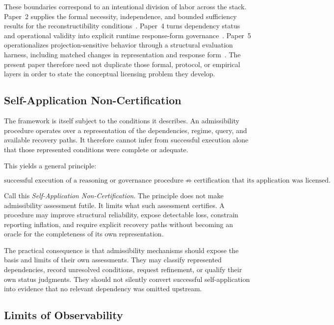 \documentclass[11pt]{article}
\begin{document}
These boundaries correspond to an intentional division of labor across the stack. Paper~2 supplies the formal necessity, independence, and bounded sufficiency results for the reconstructibility conditions~\cite{Cameron2026P2}. Paper~4 turns dependency status and operational validity into explicit runtime response-form governance~\cite{Cameron2026P4}. Paper~5 operationalizes projection-sensitive behavior through a structural evaluation harness, including matched changes in representation and response form~\cite{Cameron2026P5}. The present paper therefore need not duplicate those formal, protocol, or empirical layers in order to state the conceptual licensing problem they develop.

\subsection{Self-Application Non-Certification}

The framework is itself subject to the conditions it describes. An admissibility procedure operates over a representation of the dependencies, regime, query, and available recovery paths. It therefore cannot infer from successful execution alone that those represented conditions were complete or adequate.

This yields a general principle:

\[
\boxed{
\text{successful execution of a reasoning or governance procedure}
\not\Rightarrow
\text{certification that its application was licensed}.
}
\]

Call this \emph{Self-Application Non-Certification}. The principle does not make admissibility assessment futile. It limits what such assessment certifies. A procedure may improve structural reliability, expose detectable loss, constrain reporting inflation, and require explicit recovery paths without becoming an oracle for the completeness of its own representation.

The practical consequence is that admissibility mechanisms should expose the basis and limits of their own assessments. They may classify represented dependencies, record unresolved conditions, request refinement, or qualify their own status judgments. They should not silently convert successful self-application into evidence that no relevant dependency was omitted upstream.

\subsection{Limits of Observability}
\end{document}
